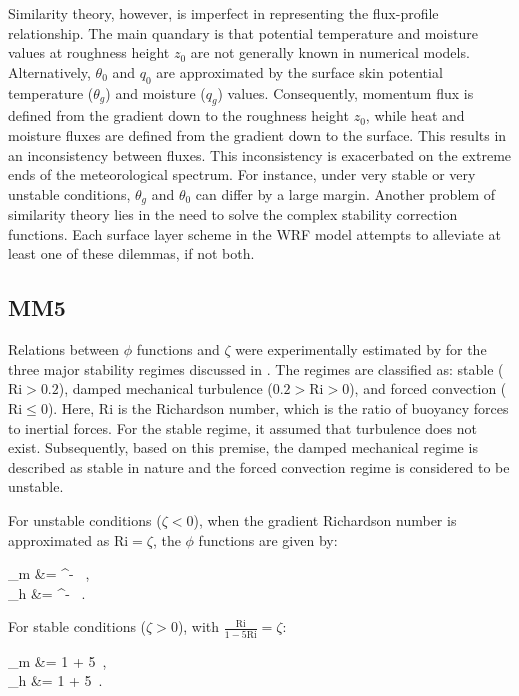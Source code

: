 Similarity theory, however, is imperfect in representing the flux-profile relationship. The main quandary is that potential temperature and moisture values at roughness height $z_0$ are not generally known in numerical models. Alternatively, $\theta_0$ and $q_0$ are approximated by the surface skin potential temperature ($\theta_g$) and moisture ($q_g$) values. Consequently, momentum flux is defined from the gradient down to the roughness height $z_0$, while heat and moisture fluxes are defined from the gradient down to the surface. This results in an inconsistency between fluxes. This inconsistency is exacerbated on the extreme ends of the meteorological spectrum. For instance, under very stable or very unstable conditions, $\theta_g$ and $\theta_0$ can differ by a large margin. Another problem of similarity theory lies in the need to solve the complex stability correction functions. Each surface layer scheme in the WRF model attempts to alleviate at least one of these dilemmas, if not both.

\subsection{MM5}
\label{sl-mm5-351}

Relations between $\phi$ functions and $\zeta$ were experimentally estimated by  \citet{Dyer} for the three major stability regimes discussed in  \citet{Zhang}. The regimes are classified as: stable ($\mathrm{Ri} > 0.2$), damped mechanical turbulence ($0.2 > \mathrm{Ri} > 0$), and forced convection ($\mathrm{Ri} \leq 0$). Here, $\mathrm{Ri}$ is the Richardson number, which is the ratio of buoyancy forces to inertial forces. For the stable regime, it assumed that turbulence does not exist. Subsequently, based on this premise, the damped mechanical regime is described as stable in nature and the forced convection regime is considered to be unstable.

For unstable conditions ($\zeta < 0$), when the gradient Richardson number is approximated as $\mathrm{Ri} = \zeta$, the $\phi$ functions are given by:

\bse \label{equation321}
\bal
\phi_m &= ^{-} \, , \label{equation321a} \\
\phi_h &= ^{-} \, . \label{equation321b}
\eal
\ese


For stable conditions ($\zeta > 0$), with $\frac{\mathrm{Ri}}{1-5\mathrm{Ri}} = \zeta$:

\bse \label{equation322}
\bal
\phi_m &= 1 + 5\zeta \, , \label{equation322a}\\
\phi_h &= 1 + 5\zeta \, . \label{equation322b}
\eal
\ese


